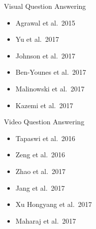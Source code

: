 \documentclass{beamer}
\begin{document}

\begin{frame}{Visual Question Answering}

\begin{itemize}
\item Agrawal et al.\ 2015
\item Yu et al.\ 2017
\item Johnson et al.\ 2017
\item Ben-Younes et al.\ 2017
\item Malinowski et al.\ 2017
\item Kazemi et al.\ 2017
\end{itemize}

\end{frame}


\begin{frame}{Video Question Answering}

\begin{itemize}
\item Tapaswi et al.\ 2016
\item Zeng et al.\ 2016
\item Zhao et al.\ 2017
\item Jang et al.\ 2017
\item Xu Hongyang et al.\ 2017
\item Maharaj et al.\ 2017
\end{itemize}

\end{frame}

\end{document}
